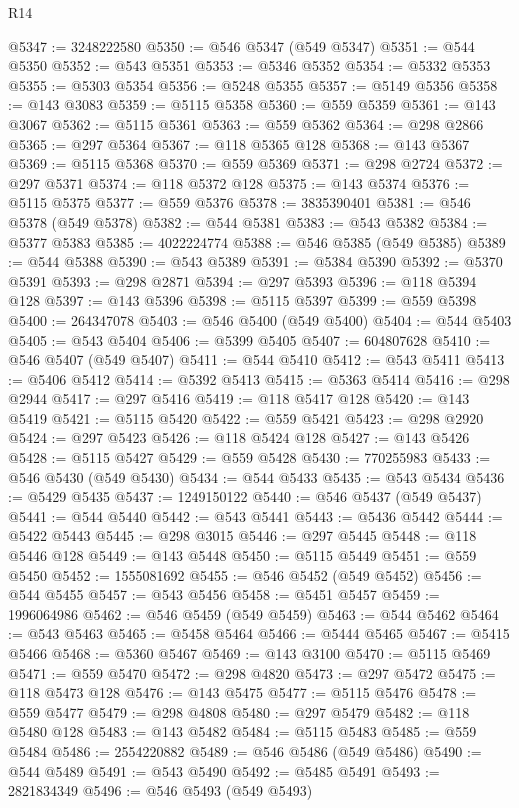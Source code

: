 \begin{lexlean}{R14}
\begin{coremodule}
{{{{{{{{{{{{{{{{{{{{{{{{{{{{{{{{{{{{{{{{{{{{{{{{{{{{{{{{{{{{{{{{{{{{{{{{{{{{{{{{{{@5347 := 3248222580
@5350 := @546 @5347 (@549 @5347)
@5351 := @544 @5350
@5352 := @543 @5351
@5353 := @5346 @5352
@5354 := @5332 @5353
@5355 := @5303 @5354
@5356 := @5248 @5355
@5357 := @5149 @5356
@5358 := @143 @3083
@5359 := @5115 @5358
@5360 := @559 @5359
@5361 := @143 @3067
@5362 := @5115 @5361
@5363 := @559 @5362
@5364 := @298 @2866
@5365 := @297 @5364
@5367 := @118 @5365 @128
@5368 := @143 @5367
@5369 := @5115 @5368
@5370 := @559 @5369
@5371 := @298 @2724
@5372 := @297 @5371
@5374 := @118 @5372 @128
@5375 := @143 @5374
@5376 := @5115 @5375
@5377 := @559 @5376
@5378 := 3835390401
@5381 := @546 @5378 (@549 @5378)
@5382 := @544 @5381
@5383 := @543 @5382
@5384 := @5377 @5383
@5385 := 4022224774
@5388 := @546 @5385 (@549 @5385)
@5389 := @544 @5388
@5390 := @543 @5389
@5391 := @5384 @5390
@5392 := @5370 @5391
@5393 := @298 @2871
@5394 := @297 @5393
@5396 := @118 @5394 @128
@5397 := @143 @5396
@5398 := @5115 @5397
@5399 := @559 @5398
@5400 := 264347078
@5403 := @546 @5400 (@549 @5400)
@5404 := @544 @5403
@5405 := @543 @5404
@5406 := @5399 @5405
@5407 := 604807628
@5410 := @546 @5407 (@549 @5407)
@5411 := @544 @5410
@5412 := @543 @5411
@5413 := @5406 @5412
@5414 := @5392 @5413
@5415 := @5363 @5414
@5416 := @298 @2944
@5417 := @297 @5416
@5419 := @118 @5417 @128
@5420 := @143 @5419
@5421 := @5115 @5420
@5422 := @559 @5421
@5423 := @298 @2920
@5424 := @297 @5423
@5426 := @118 @5424 @128
@5427 := @143 @5426
@5428 := @5115 @5427
@5429 := @559 @5428
@5430 := 770255983
@5433 := @546 @5430 (@549 @5430)
@5434 := @544 @5433
@5435 := @543 @5434
@5436 := @5429 @5435
@5437 := 1249150122
@5440 := @546 @5437 (@549 @5437)
@5441 := @544 @5440
@5442 := @543 @5441
@5443 := @5436 @5442
@5444 := @5422 @5443
@5445 := @298 @3015
@5446 := @297 @5445
@5448 := @118 @5446 @128
@5449 := @143 @5448
@5450 := @5115 @5449
@5451 := @559 @5450
@5452 := 1555081692
@5455 := @546 @5452 (@549 @5452)
@5456 := @544 @5455
@5457 := @543 @5456
@5458 := @5451 @5457
@5459 := 1996064986
@5462 := @546 @5459 (@549 @5459)
@5463 := @544 @5462
@5464 := @543 @5463
@5465 := @5458 @5464
@5466 := @5444 @5465
@5467 := @5415 @5466
@5468 := @5360 @5467
@5469 := @143 @3100
@5470 := @5115 @5469
@5471 := @559 @5470
@5472 := @298 @4820
@5473 := @297 @5472
@5475 := @118 @5473 @128
@5476 := @143 @5475
@5477 := @5115 @5476
@5478 := @559 @5477
@5479 := @298 @4808
@5480 := @297 @5479
@5482 := @118 @5480 @128
@5483 := @143 @5482
@5484 := @5115 @5483
@5485 := @559 @5484
@5486 := 2554220882
@5489 := @546 @5486 (@549 @5486)
@5490 := @544 @5489
@5491 := @543 @5490
@5492 := @5485 @5491
@5493 := 2821834349
@5496 := @546 @5493 (@549 @5493)
}}}}}}}}}}}}}}}}}}}}}}}}}}}}}}}}}}}}}}}}}}}}}}}}}}}}}}}}}}}}}}}}}}}}}}}}}}}}}}}}}}
\end{coremodule}
\end{lexlean}
